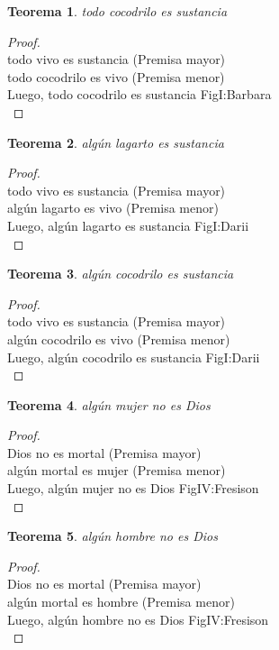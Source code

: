 ﻿\documentclass[12pt]{book}
\newtheorem{theorem}{Teorema}[chapter]
\newtheorem{proof}{Demostración}
\begin{document}
\begin{theorem}
todo cocodrilo es sustancia
\label{th: 99}
\end{theorem}\begin{proof}\\todo vivo es sustancia	 (Premisa mayor) \\todo cocodrilo es vivo	 (Premisa menor) \\Luego, todo cocodrilo es sustancia	FigI:Barbara \\ \end{proof}
\begin{theorem}
algún lagarto es sustancia
\label{th: 100}
\end{theorem}\begin{proof}\\todo vivo es sustancia	 (Premisa mayor) \\algún lagarto es vivo	 (Premisa menor) \\Luego, algún lagarto es sustancia	FigI:Darii \\ \end{proof}
\begin{theorem}
algún cocodrilo es sustancia
\label{th: 101}
\end{theorem}\begin{proof}\\todo vivo es sustancia	 (Premisa mayor) \\algún cocodrilo es vivo	 (Premisa menor) \\Luego, algún cocodrilo es sustancia	FigI:Darii \\ \end{proof}
\begin{theorem}
algún mujer no es Dios
\label{th: 102}
\end{theorem}\begin{proof}\\Dios no es mortal	 (Premisa mayor) \\algún mortal es mujer	 (Premisa menor) \\Luego, algún mujer no es Dios	FigIV:Fresison \\ \end{proof}
\begin{theorem}
algún hombre no es Dios
\label{th: 103}
\end{theorem}\begin{proof}\\Dios no es mortal	 (Premisa mayor) \\algún mortal es hombre	 (Premisa menor) \\Luego, algún hombre no es Dios	FigIV:Fresison \\ \end{proof}
\end{document}
